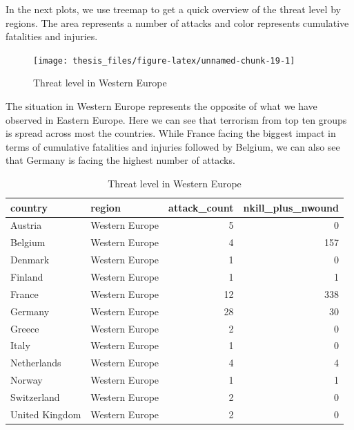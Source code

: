 \documentclass[11pt,oneside,a4paper]{reedthesis}
\newenvironment{Shaded}{\begin{snugshade}}{\end{snugshade}}
\newcommand{\KeywordTok}[1]{\textcolor[rgb]{0.13,0.29,0.53}{\textbf{#1}}}
\newcommand{\StringTok}[1]{\textcolor[rgb]{0.31,0.60,0.02}{#1}}
\newcommand{\OperatorTok}[1]{\textcolor[rgb]{0.81,0.36,0.00}{\textbf{#1}}}
\newcommand{\NormalTok}[1]{#1}
\begin{document}
In the next plots, we use treemap to get a quick overview of the threat
level by regions. The area represents a number of attacks and color
represents cumulative fatalities and injuries.
\begin{Shaded}
\end{Shaded}
\begin{figure}
\texttt{[image: thesis\_files/figure-latex/unnamed-chunk-19-1]} \caption{Threat level in Western Europe}\label{fig:unnamed-chunk-19}
\end{figure}
The situation in Western Europe represents the opposite of what we have
observed in Eastern Europe. Here we can see that terrorism from top ten
groups is spread across most the countries. While France facing the
biggest impact in terms of cumulative fatalities and injuries followed
by Belgium, we can also see that Germany is facing the highest number of
attacks.
\begin{table}[H]

\caption{\label{tab:unnamed-chunk-20}Threat level in Western Europe}
\centering
\fontsize{12}{14}\selectfont
\begin{tabular}[t]{llrr}
\toprule
country & region & attack\_count & nkill\_plus\_nwound\\
\midrule
Austria & Western Europe & 5 & 0\\
Belgium & Western Europe & 4 & 157\\
Denmark & Western Europe & 1 & 0\\
Finland & Western Europe & 1 & 1\\
France & Western Europe & 12 & 338\\
\addlinespace
Germany & Western Europe & 28 & 30\\
Greece & Western Europe & 2 & 0\\
Italy & Western Europe & 1 & 0\\
Netherlands & Western Europe & 4 & 4\\
Norway & Western Europe & 1 & 1\\
\addlinespace
Switzerland & Western Europe & 2 & 0\\
United Kingdom & Western Europe & 2 & 0\\
\bottomrule
\end{tabular}
\end{table}
\end{document}
